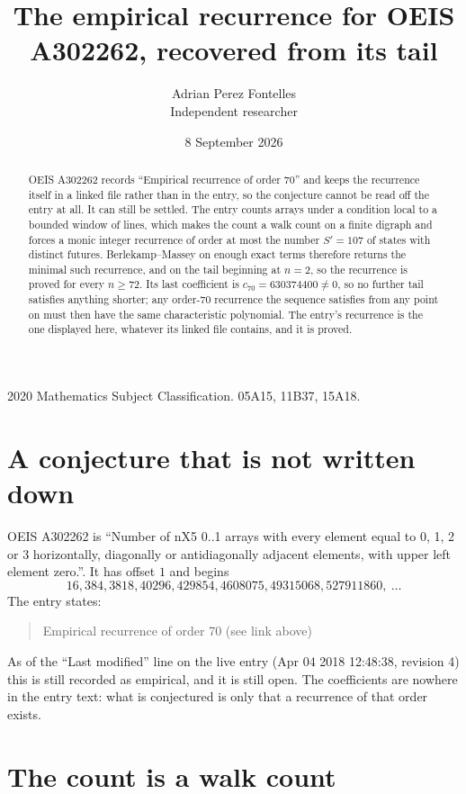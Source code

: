 \documentclass[11pt,a4paper]{article}
\title{The empirical recurrence for OEIS A302262, recovered from its tail}
\author{Adrian Perez Fontelles\\ \small Independent researcher}
\date{8 September 2026}
\theoremstyle{plain}
\theoremstyle{definition}
\begin{document}
\maketitle

\begin{abstract}
OEIS A302262 records ``Empirical recurrence of order $70$'' and keeps the recurrence itself in
a linked file rather than in the entry, so the conjecture cannot be read off the entry at all.
It can still be settled. The entry counts arrays under a condition local to a bounded window of
lines, which makes the count a walk count on a finite digraph and forces a monic integer
recurrence of order at most the number $S'=107$ of states with distinct futures. Berlekamp--Massey on
enough exact terms therefore returns the minimal such recurrence, and on the tail beginning at $n=2$, so the recurrence is proved for every $n\ge72$.
Its last coefficient is $c_{70}=630374400\neq0$, so no further tail satisfies anything
shorter; any order-$70$ recurrence the sequence satisfies from any point on must then have
the same characteristic polynomial. The entry's recurrence is the one displayed here, whatever
its linked file contains, and it is proved.
\end{abstract}

\noindent\small 2020 Mathematics Subject Classification. 05A15, 11B37, 15A18.\normalsize

\section{A conjecture that is not written down}

OEIS A302262 is ``Number of nX5 0..1 arrays with every element equal to 0, 1, 2 or 3 horizontally, diagonally or antidiagonally adjacent elements, with upper left element zero.''. It has offset $1$ and begins
\[
16, 384, 3818, 40296, 429854, 4608075, 49315068, 527911860,\ \dots
\]
The entry states:
\begin{quote}
Empirical recurrence of order 70 (see link above)
\end{quote}
As of the ``Last modified'' line on the live entry (Apr 04 2018 12:48:38, revision 4)
this is still recorded as empirical, and it is still open. The coefficients are nowhere in the
entry text: what is conjectured is only that a recurrence of that order exists.

\section{The count is a walk count}
\end{document}
